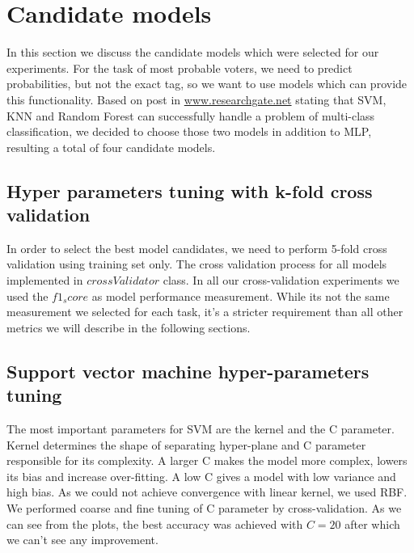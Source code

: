 \documentclass[12pt]{article}
\begin{document}
\section{Candidate models}
In this section we discuss the candidate models which were selected for our experiments. For the task of most probable voters, we need to predict probabilities, but not the exact tag, so we want to use models which can provide this functionality. Based on post in \href{https://www.researchgate.net/post/What_are_the_best_supervised_classifiers_to_classify_the_problem_of_multiclass_classification}{www.researchgate.net} stating that SVM, KNN and Random Forest can successfully handle a problem of multi-class classification, we decided to choose those two models in addition to MLP, resulting a total of four candidate models.

\subsection{Hyper parameters tuning with k-fold cross validation}
In order to select the best model candidates, we need to perform 5-fold cross validation using training set only. The cross validation process for all models implemented in $crossValidator$ class. In all our cross-validation experiments we used the $f1_score$ as model performance measurement. While its not the same measurement we selected for each task, it's a stricter requirement than all other metrics we will describe in the following sections.

\subsection{Support vector machine hyper-parameters tuning}
The most important parameters for SVM are the kernel and the C parameter. Kernel determines the shape of separating hyper-plane and C parameter responsible for its complexity. A larger C makes the model more complex, lowers its bias and increase over-fitting. A low C gives a model with low variance and high bias. As we could not achieve convergence with linear kernel, we used RBF. We performed coarse and fine tuning of C parameter by cross-validation. As we can see from the plots, the best accuracy was achieved with $C=20$ after which we can't see any improvement.
\end{document}
